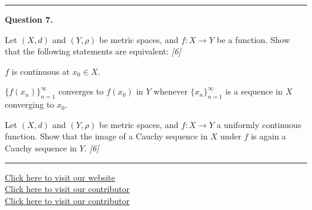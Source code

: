 \documentclass[11pt,a4paper]{article}
\newcommand{\pts}[1]{\hfill   \textit{[#1]}}
\begin{document}
\medskip\rule{\linewidth}{0.2pt}

\medskip


\noindent   \textbf{Question 7.}

\begin{parts}
  \item Let $(X,d)$ and $(Y, \rho)$ be metric spaces, and $f : X \rightarrow Y$ be a function. Show that the following statements are equivalent: \pts{6}
  
\begin{parts}
    \item $f$ is continuous at $x_0 \in X$.
    \item $\{f(x_n)\}_{n=1}^\infty$ converges to $f(x_0)$ in $Y$ whenever $\{x_n\}_{n=1}^\infty$ is a sequence in $X$ converging to $x_0$.
  \end{parts}
  \item Let $(X,d)$ and $(Y, \rho)$ be metric spaces, and $f : X \rightarrow Y$ a uniformly continuous function. Show that the image of a Cauchy sequence in $X$ under $f$ is again a Cauchy sequence in $Y$. \pts{6}
\end{parts}

\vfill
\rule{\linewidth}{0.4pt}

\begin{center}\small
\href{https://bhu-exam.vercel.app/}{Click here to visit our website}\\[4pt]
\href{https://me-aryan.vercel.app/}{Click here to visit our contributor}\\[4pt]
\href{https://quashan-me.vercel.app/}{Click here to visit our contributor}
\end{center}
\end{document}
